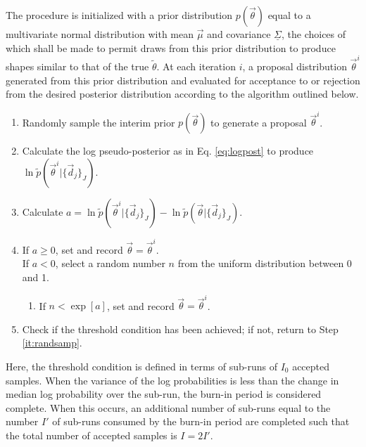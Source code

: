 \documentclass[preprint]{aastex}
\newcommand{\textul}{\underline}
\begin{document}
The procedure is initialized with a prior distribution $p(\vec{\theta})$ equal to a multivariate normal distribution with mean $\vec{\mu}$ and covariance $\textul{\Sigma}$, the choices of which shall be made to permit draws from this prior distribution to produce shapes similar to that of the true $\tilde{\theta}$.  At each iteration $i$, a proposal distribution $\vec{\theta}^{i}$ generated from this prior distribution and evaluated for acceptance to or rejection from the desired posterior distribution according to the algorithm outlined below.  %


\begin{enumerate}
\item \label{it:randsamp} Randomly sample the interim prior $p(\vec{\theta})$ to generate a proposal $\vec{\theta}^{i}$.
\item Calculate the log pseudo-posterior as in Eq. \ref{eq:logpost} to produce $\ln\tilde{p}(\vec{\theta}^{i}|\{\vec{d}_{j}\}_{J})$.
\item Calculate $a=\ln\tilde{p}(\vec{\theta}^{i}|\{\vec{d}_{j}\}_{J})-\ln\tilde{p}(\vec{\theta}|\{\vec{d}_{j}\}_{J})$.
\item If $a\geq0$, set and record $\vec{\theta}=\vec{\theta}^{i}$.\\
If $a<0$, select a random number $n$ from the uniform distribution between 0 and 1.
\begin{enumerate}
\item If $n<\exp[a]$, set and record $\vec{\theta}=\vec{\theta}^{i}$.
\end{enumerate}
\item Check if the threshold condition has been achieved; if not, return to Step \ref{it:randsamp}.
\end{enumerate}

Here, the threshold condition is defined in terms of sub-runs of $I_{0}$ accepted samples.  When the variance of the log probabilities is less than the change in median log probability over the sub-run, the burn-in period is considered complete.  When this occurs, an additional number of sub-runs equal to the number $I'$ of sub-runs consumed by the burn-in period are completed such that the total number of accepted samples is $I=2I'$.  
\end{document}
